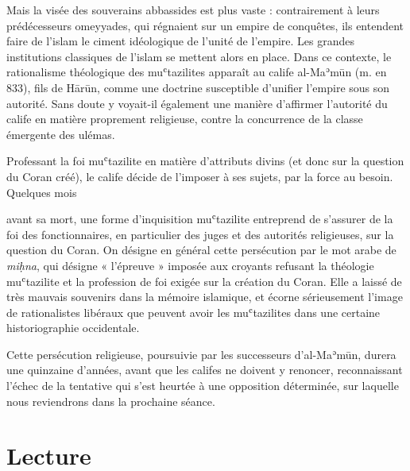 Mais la visée des souverains abbassides est plus vaste : contrairement à
leurs prédécesseurs omeyyades, qui régnaient sur un empire de conquêtes,
ils entendent faire de l'islam le ciment idéologique de l'unité de
l'empire. Les grandes institutions classiques de l'islam se mettent
alors en place. Dans ce contexte, le rationalisme théologique des
muʿtazilites apparaît au calife al-Maʾmūn (m. en 833), fils de Hārūn,
comme une doctrine susceptible d'unifier l'empire sous son autorité.
Sans doute y voyait-il également une manière d'affirmer l'autorité du
calife en matière proprement religieuse, contre la concurrence de la
classe émergente des ulémas.

Professant la foi muʿtazilite en matière d'attributs divins (et donc sur
la question du Coran créé), le calife décide de l'imposer à ses sujets,
par la force au besoin. Quelques mois

avant sa mort, une forme d'inquisition muʿtazilite entreprend de
s'assurer de la foi des fonctionnaires, en particulier des juges et des
autorités religieuses, sur la question du Coran. On désigne en général
cette persécution par le mot arabe de \emph{miḥna}, qui désigne «
l'épreuve » imposée aux croyants refusant la théologie muʿtazilite et la
profession de foi exigée sur la création du Coran. Elle a laissé de très
mauvais souvenirs dans la mémoire islamique, et écorne sérieusement
l'image de rationalistes libéraux que peuvent avoir les muʿtazilites
dans une certaine historiographie occidentale.

Cette persécution religieuse, poursuivie par les successeurs
d'al-Maʾmūn, durera une quinzaine d'années, avant que les califes ne
doivent y renoncer, reconnaissant l'échec de la tentative qui s'est
heurtée à une opposition déterminée, sur laquelle nous reviendrons dans
la prochaine séance.

\hypertarget{lecture}{%
\section{Lecture}\label{lecture}}

